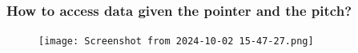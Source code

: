 \documentclass[9pt]{beamer}
\begin{document}
\begin{frame}[fragile]
\frametitle{How to access data given the pointer and the pitch?}
\begin{figure}
    \centering
    \texttt{[image: Screenshot from 2024-10-02 15-47-27.png]}
\end{figure}

\end{frame}


 %
\end{document}
